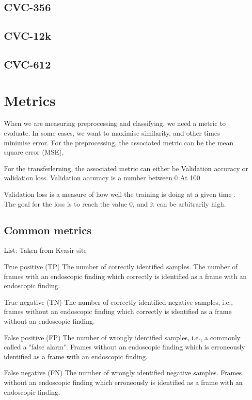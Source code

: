    \subsection{CVC-356}
    \subsection{CVC-12k}
    \subsection{CVC-612}

\section{Metrics}
When we are measuring preprocessing and classifying, we need a metric to evaluate. In some cases, we want to maximise similarity, and other times minimise error. 
For the preprocessing, the associated metric can be the mean square error (MSE), 

For the transferlerning, the associated metric can either be Validation accuracy or validation loss. 
Validation accuracy is a number between 0%
At 100%

Validation loss is a measure of how well the training is doing at a given time . The goal for the loss is to reach the value 0, and it can be arbitrarily high.

\subsection{Common metrics}
List:
Taken from Kvasir site

True positive (TP)    The number of correctly identified samples. The number of frames with an endoscopic finding which correctly is identified as a frame with an endoscopic finding.

True negative (TN)    The number of correctly identified negative samples, i.e., frames without an endoscopic finding which correctly is identified as a frame without an endoscopic finding.

False positive (FP)    The number of wrongly identified samples, i.e., a commonly called a "false alarm". Frames without an endoscopic finding which is erroneously identified as a frame with an endoscopic finding.

False negative (FN)    The number of wrongly identified negative samples. Frames without an endoscopic finding which erroneously is identified as a frame with an endoscopic finding.

